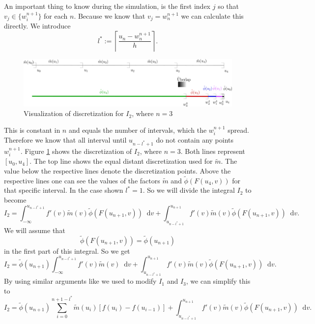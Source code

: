 \documentclass[12pt,a4paper,twoside, open=right]{scrreprt}
\theoremstyle{definition}
\theoremstyle{plain}
\newcommand{\D}{\mathop{}\!\mathrm{d}}
\begin{document}
\par An important thing to know during the simulation, is the first index $j$ so that $v_j\in\{w_i^{n+1}\}$ for each $n$. Because we know that $v_j = w_{n}^{n+1}$ we can calculate this directly. We introduce 
\begin{equation}
    l^*:=\left\lceil  \frac{u_n -w_{n}^{n+1}}{h}\right\rceil.
\end{equation}
\begin{figure}
    \centering
    \includegraphics[width=\textwidth]{Tranformls1}
    \caption{Visualization of discretization for $I_2$, where $n=3$}
    \label{fig:vis1}
\end{figure}
 This is constant in $n$ and equals the number of intervals, which the $w_i^{n+1}$ spread. Therefore we know that all interval until $u_{n-l^*+1}$ do not contain any points $w_i^{n+1}$.
 Figure \ref{fig:vis1} shows the discretization of $I_2$, where $n=3$. Both lines represent $[u_0,u_4]$. The top line shows the equal distant discretization used for $\tilde{m}$. The value below the respective lines denote the discretization points. Above the respective lines one can see the values of the factors $\tilde{m}$ and $\tilde\phi(F(u_4,v))$ for that specific interval. In the case shown $l^*=1$. So we will divide the integral $I_2$ to become
\begin{equation}
    I_2 = \int_{-\infty}^{u_{n-l^*+1}}f'(v)\tilde{m}(v)\tilde{\phi}(F(u_{n+1},v))\D v + \int_{u_{n-l^* +1}}^{u_{n+1}}f'(v)\tilde{m}(v)\tilde{\phi}(F(u_{n+1},v))\D v.
\end{equation}
We will assume that \begin{equation}
    \tilde\phi(F(u_{n+1},v))=\tilde\phi(u_{n+1})
\end{equation}
in the first part of this integral. So we get 
\begin{equation}
    I_2 = \tilde\phi(u_{n+1})\int_{-\infty}^{u_{n-l^*+1}}f'(v)\tilde{m}(v)\D v+ \int_{u_{n-l^* +1}}^{u_{n+1}}f'(v)\tilde{m}(v)\tilde{\phi}(F(u_{n+1},v))\D v.
\end{equation}
By using similar arguments like we used to modify $I_1$ and $I_3$, we can simplify this to 
\begin{equation}
    I_2 = \tilde{\phi}(u_{n+1})\sum_{i=0}^{n+1-l^*}\tilde{m}(u_i)[f(u_i)-f(u_{i-1})]+ \int_{u_{n-l^* +1}}^{u_{n+1}}f'(v)\tilde{m}(v)\tilde{\phi}(F(u_{n+1},v))\D v.
\end{equation}
\end{document}
